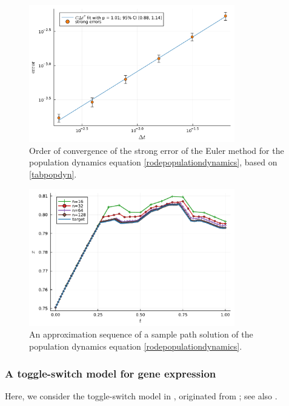 \documentclass[reqno,12pt]{amsart}
\theoremstyle{plain} %
\theoremstyle{definition} %
\begin{document}
\begin{figure}[htb]
    \centerline{\includegraphics[width=0.8\textwidth]{img/order_popdyn_gBmPoisson.pdf}}
    \caption{Order of convergence of the strong error of the Euler method for the population dynamics equation \cref{rodepopulationdynamics}, based on \cref{tabpopdyn}.}
    \label{figpopdyn}
\end{figure}

\begin{figure}[htb]
    \centerline{\includegraphics[width=0.8\textwidth]{img/sample_popdyn_gBmPoisson.pdf}}
    \caption{An approximation sequence of a sample path solution of the population dynamics equation \cref{rodepopulationdynamics}.}
    \label{figsamplepopdyn}
\end{figure}

\subsubsection{A toggle-switch model for gene expression}

Here, we consider the toggle-switch model in \cite[Section 7.8]{Asai2016}, originated from \cite{VerdCrombachJaeger2014}; see also \cite{StrasserTheisMarr2012}.
\end{document}
